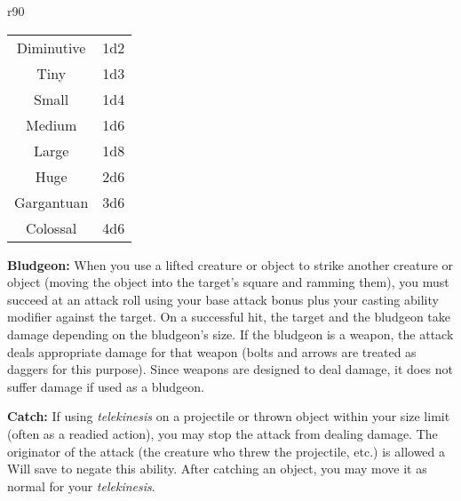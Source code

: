 {\begin{wraptable}{r}{90\unitlength}
\begin{tabular}{cc}
		Diminutive	& 1d2	\\
		Tiny		& 1d3	\\
		Small		& 1d4	\\
		Medium		& 1d6	\\
		Large		& 1d8	\\
		Huge		& 2d6	\\
		Gargantuan	& 3d6	\\
		Colossal	& 4d6	
	\end{tabular}
\end{wraptable}%
\par \textbf{Bludgeon:} When you use a lifted creature or object to strike another creature or object (moving the object into the target's square and ramming them), you must succeed at an attack roll using your base attack bonus plus your casting ability modifier against the target. On a successful hit, the target and the bludgeon take damage depending on the bludgeon's size. If the bludgeon is a weapon, the attack deals appropriate damage for that weapon (bolts and arrows are treated as daggers for this purpose). Since weapons are designed to deal damage, it does not suffer damage if used as a bludgeon.
\par \textbf{Catch:} If using \textit{telekinesis} on a projectile or thrown object within your size limit (often as a readied action), you may stop the attack from dealing damage. The originator of the attack (the creature who threw the projectile, etc.) is allowed a Will save to negate this ability. After catching an object, you may move it as normal for your \textit{telekinesis}.
}
